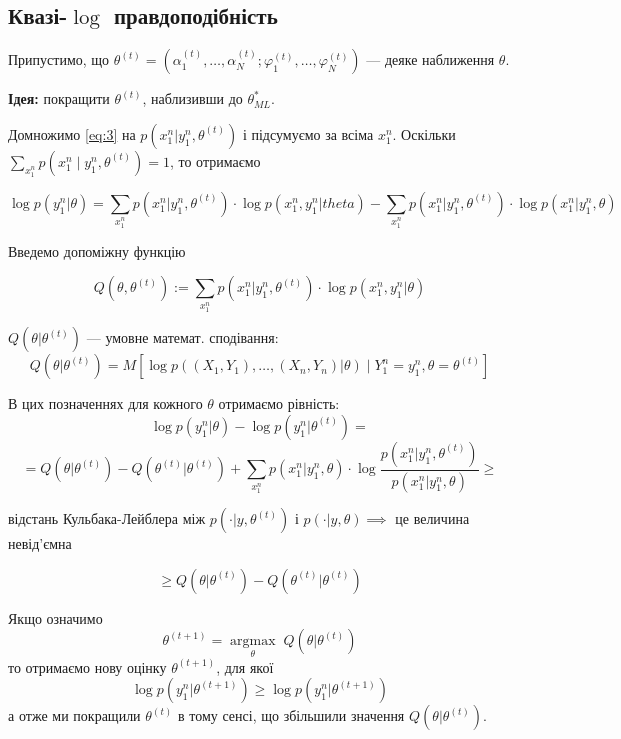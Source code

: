 \subsection{Квазі-$\log$ правдоподібність}

Припустимо, що $\theta^{(t)} = \left( \alpha_1^{(t)}, \ldots, \alpha_N^{(t)}; \varphi_1^{(t)}, \ldots, \varphi_N^{(t)} \right) $
--- деяке наближення $\theta$.

\textbf{Ідея:} покращити  $\theta^{(t)}$, наблизивши до $\theta_{ML}^{*}$.

Домножимо \ref{eq:3} на $p\left( x_1^{n} | y_1^{n} , \theta^{(t)} \right)$ і
підсумуємо за всіма $x_1^{n}$. Оскільки $\sum_{x_1^{n}}^{} p\left( x_1^{n} \mid 
y_1^{n}, \theta^{(t)}\right) = 1 $,
то отримаємо

\[ \log p\left( y_1^{n}|\theta \right) = \sum_{x_1^{n}}^{} p\left( x_1^{n} | y_1^{n}, \theta^{(t)} \right)  \cdot \log p\left( x_1^{n}, y_1^{n} | theta \right) - 
\sum_{x_1^{n}}^{} p\left( x_1^{n} | y_1^{n}, \theta^{(t)} \right) \cdot \log p\left( x_1^{n} | y_1^{n}, \theta \right) \] 

Введемо допоміжну функцію

\[ Q(\theta, \theta^{(t)}) := \sum_{x_1^{n}}^{} p\left( x_1^{n} | y_1^{n}, \theta^{(t)} \right) 
\cdot \log p\left( x_1^{n}, y_1^{n} | \theta \right) \] 

$Q\left( \theta | \theta^{(t)} \right) $ --- умовне математ. сподівання:
\[ Q\left( \theta | \theta^{(t)} \right)  = M \left[ 
\log p\left(  (X_1,Y_1),\ldots,(X_n,Y_n) | \theta \right) \mid Y_1^{n} = y_1^{n}, \theta = \theta^{(t)} \right]  \] 

В цих позначеннях для кожного $\theta$ отримаємо рівність:
\[ \log p(y_1^{n}|\theta) - \log p(y_1^{n}|\theta^{(t)}) = \] 
\[ = Q(\theta|\theta^{(t)}) - Q(\theta^{(t)} | \theta^{(t)}) + 
\sum_{x_1^{n}}^{} p(x_1^{n}|y_1^{n},\theta) \cdot \log \frac{
p(x_1^{n}|y_1^{n},\theta^{(t)})}{p(x_1^{n}|y_1^{n},\theta)} \geq\] 

відстань Кульбака-Лейблера між $p(\cdot|y, \theta^{(t)})$ і
$p(\cdot|y,\theta) \implies$ це величина невід'ємна

\[ \geq Q(\theta | \theta^{(t)}) - Q\left( \theta^{(t)} | \theta^{(t)} \right)  \] 

Якщо означимо
\[ \theta^{(t+1)} = \underset{\theta}{\operatorname{argmax}} \; Q\left( \theta | \theta^{(t)} \right) \]
то отримаємо нову оцінку $\theta^{(t+1)}$, для якої
\[ \log p\left( y_1^{n} | \theta^{(t+1)} \right) \geq \log p \left( 
y_1^{n} | \theta^{(t+1)} \right) \]
а отже ми покращили $\theta^{(t)}$ в тому сенсі,
що збільшили значення $Q(\theta | \theta^{(t)})$.

